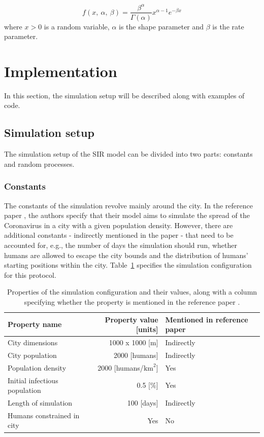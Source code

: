 \documentclass[a4paper]{article}
\begin{document}
\begin{equation}
	f(x,\:\alpha,\:\beta) = \frac{\beta^\alpha}{\Gamma \left(\alpha\right)} x^{\alpha-1} e^{-\beta x}
	\label{equation:gamma-distr}
\end{equation}
\noindent
where $x > 0$ is a random variable, $\alpha$ is the shape parameter and $\beta$ is the rate parameter.




\section{Implementation}\label{section:implementation}
In this section, the simulation setup will be described along with examples of code.

\subsection{Simulation setup}
The simulation setup of the SIR model can be divided into two parts: constants and random processes.

\subsubsection{Constants}
The constants of the simulation revolve mainly around the city. In the reference paper \cite{Maltezos2021}, the authors specify that their model aims to simulate the spread of the Coronavirus in a city with a given population density. However, there are additional constants - indirectly mentioned in the paper - that need to be accounted for, e.g., the number of days the simulation should run, whether humans are allowed to escape the city bounds and the distribution of humans' starting positions within the city. Table~\ref{table:simulation-configuration} specifies the simulation configuration for this protocol.

\begin{table}[!h]
	\centering
	\begin{tabular}{ |l|r|l|  }
		\hline
		Property name & Property value [units] & Mentioned in reference paper \\
		\hline
		\hline
		City dimensions               & 1000 x 1000 [m]                 & Indirectly \\
		City population               & 2000 [humans]                   & Indirectly \\
		Population density            & 2000 [humans/$\textrm{km}^2$]   & Yes \\
		Initial infectious population & 0.5 [\%]                        & Yes 	  	 \\
		Length of simulation          & 100 [days]                      & Indirectly \\
		Humans constrained in city    & Yes                             & No         \\
		\hline
	\end{tabular}
	\caption{Properties of the simulation configuration and their values, along with a column specifying whether the property is mentioned in the reference paper \cite{Maltezos2021}.}
	\label{table:simulation-configuration}
\end{table}
\end{document}
